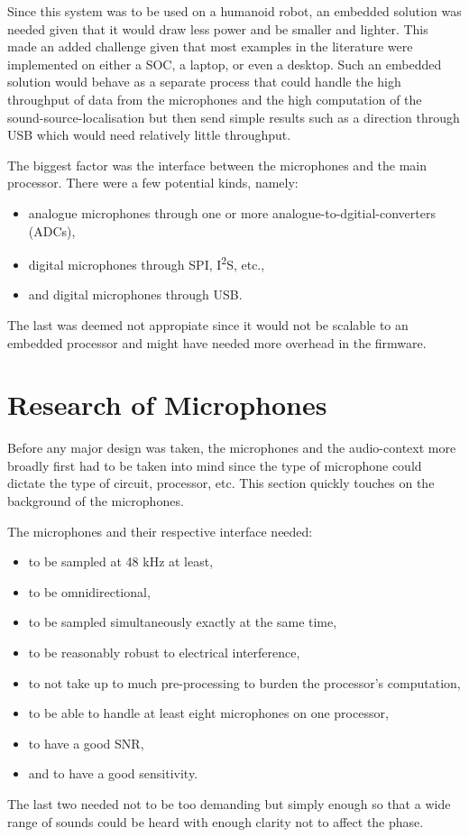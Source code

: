 \documentclass[notitlepage]{report}
\begin{document}
Since this system was to be used on a humanoid robot, an embedded solution was needed given that it would draw less power and be smaller and lighter. This made an added challenge given that most examples in the literature were implemented on either a SOC, a laptop, or even a desktop. Such an embedded solution would behave as a separate process that could handle the high throughput of data from the microphones and the high computation of the sound-source-localisation but then send simple results such as a direction through USB which would need relatively little throughput.

The biggest factor was the interface between the microphones and the main processor. There were a few potential kinds, namely:
\begin{itemize}
	\item analogue microphones through one or more analogue-to-dgitial-converters (ADCs),
	\item digital microphones through SPI, I\textsuperscript{2}S, etc.,
	\item and digital microphones through USB.
\end{itemize}
The last was deemed not appropiate since it would not be scalable to an embedded processor and might have needed more overhead in the firmware.

\section{Research of Microphones}

Before any major design was taken, the microphones and the audio-context more broadly first had to be taken into mind since the type of microphone could dictate the type of circuit, processor, etc. This section quickly touches on the background of the microphones.

The microphones and their respective interface needed:
\begin{itemize}
	\item to be sampled at 48 \si{kHz} at least,
	\item to be omnidirectional,
	\item to be sampled simultaneously exactly at the same time,
	\item to be reasonably robust to electrical interference,
	\item to not take up to much pre-processing to burden the processor's computation,
	\item to be able to handle at least eight microphones on one processor,
	\item to have a good SNR,
	\item and to have a good sensitivity.
\end{itemize}
The last two needed not to be too demanding but simply enough so that a wide range of sounds could be heard with enough clarity not to affect the phase.
\end{document}

